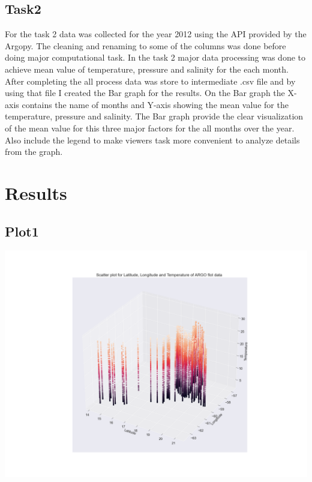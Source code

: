 \documentclass[12pt, letterpaper]{article}
\begin{document}
\subsection{Task2}

For the task 2 data was collected for the year 2012 using the API provided by the Argopy. The cleaning and renaming to some of the columns was done before doing major computational task. In the task 2 major data processing was done to achieve mean value of temperature, pressure and salinity for the each month. After completing the all process data was store to intermediate .csv file and by using that file I created the Bar graph for the results. On the Bar graph the X-axis contains the name of months and Y-axis showing the mean value for the temperature, pressure and salinity. The Bar graph provide the clear visualization of the mean value for this three major factors for the all months over the year. Also include the legend to make viewers task more convenient to analyze details from the graph. 


\section{Results}
\subsection{Plot1}

\includegraphics[width=\textwidth]{plot1.png}
\end{document}
